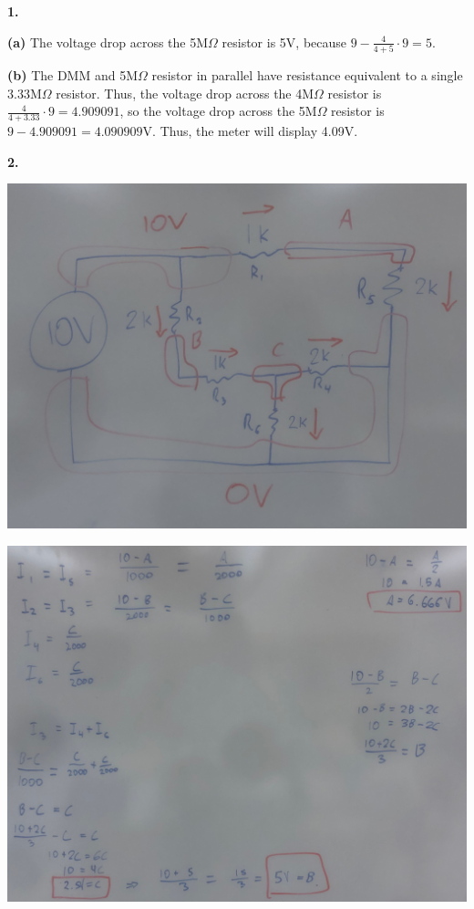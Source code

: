 \documentclass{article}
\begin{document}
\pagecolor{black}
\color{white}

\medskip\noindent\textbf{1.}

	\textbf{(a)} The voltage drop across the 5M$\Omega$ resistor is 5V, because $9 - \frac{4}{4+5} \cdot 9 = 5$.

	\textbf{(b)} The DMM and 5M$\Omega$ resistor in parallel have resistance equivalent to a single $3.33$M$\Omega$ resistor. Thus, the voltage drop across the 4M$\Omega$ resistor is $\frac4{4+3.33}\cdot9 = 4.909091$, so the voltage drop across the 5M$\Omega$ resistor is $9 - 4.909091 = 4.090909$V. Thus, the meter will display 4.09V.

\newpage\noindent\textbf{2.}

    \begin{center}
        \includegraphics[scale=.07]{IMG_0869.jpg}

        \includegraphics[scale=.1]{IMG_0870.jpg}
        

\end{center}
\end{document}

